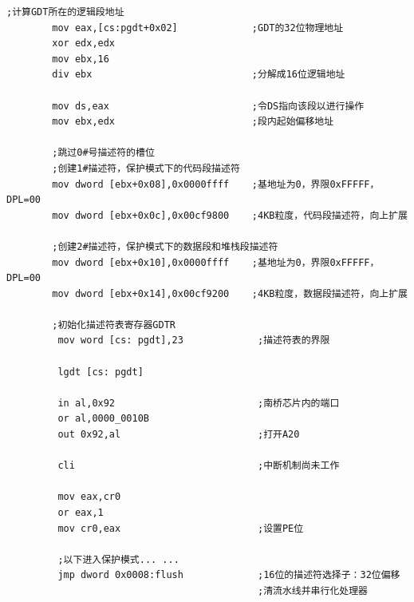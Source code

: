 \documentclass[a4paper,11pt,UTF8]{ctexart}
\begin{document}
	\begin{lstlisting}[caption={安装 gdt},tabsize=4,basicstyle=\footnotesize,captionpos=b]
		;计算GDT所在的逻辑段地址
		mov eax,[cs:pgdt+0x02]             ;GDT的32位物理地址 
		xor edx,edx
		mov ebx,16
		div ebx                            ;分解成16位逻辑地址 

		mov ds,eax                         ;令DS指向该段以进行操作
		mov ebx,edx                        ;段内起始偏移地址 

		;跳过0#号描述符的槽位 
		;创建1#描述符，保护模式下的代码段描述符
		mov dword [ebx+0x08],0x0000ffff    ;基地址为0，界限0xFFFFF，DPL=00 
		mov dword [ebx+0x0c],0x00cf9800    ;4KB粒度，代码段描述符，向上扩展 

		;创建2#描述符，保护模式下的数据段和堆栈段描述符 
		mov dword [ebx+0x10],0x0000ffff    ;基地址为0，界限0xFFFFF，DPL=00
		mov dword [ebx+0x14],0x00cf9200    ;4KB粒度，数据段描述符，向上扩展 

		;初始化描述符表寄存器GDTR
         mov word [cs: pgdt],23             ;描述符表的界限   
 
         lgdt [cs: pgdt]
      
         in al,0x92                         ;南桥芯片内的端口 
         or al,0000_0010B
         out 0x92,al                        ;打开A20

         cli                                ;中断机制尚未工作

         mov eax,cr0                  
         or eax,1
         mov cr0,eax                        ;设置PE位
      
         ;以下进入保护模式... ...
         jmp dword 0x0008:flush             ;16位的描述符选择子：32位偏移
                                            ;清流水线并串行化处理器
	\end{lstlisting}

			
\end{document}
